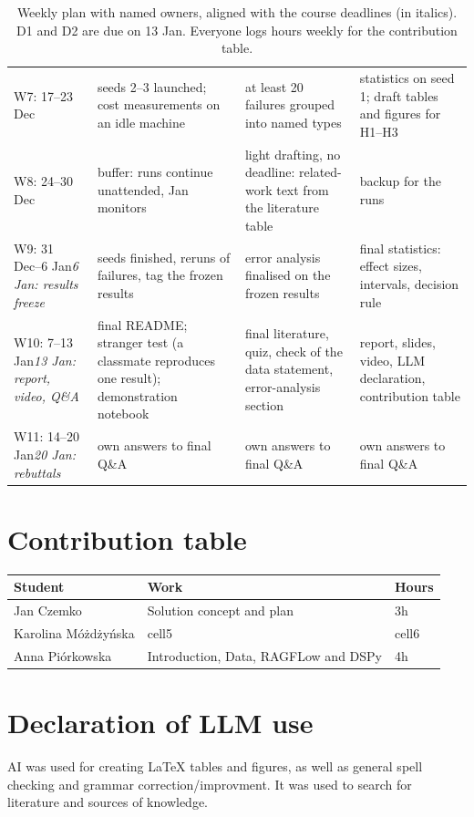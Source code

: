 \documentclass[11pt]{article}
\begin{document}
\begin{table}[t]
\begin{tabular}{@{}>{\raggedright\arraybackslash}p{2.7cm}>{\raggedright\arraybackslash}p{4.1cm}>{\raggedright\arraybackslash}p{4.1cm}>{\raggedright\arraybackslash}p{4.1cm}@{}}
\addlinespace
W7: 17--23 Dec & seeds 2--3 launched; cost measurements on an idle machine & at least 20 failures grouped into named types & statistics on seed 1; draft tables and figures for H1--H3\\
\addlinespace
W8: 24--30 Dec & buffer: runs continue unattended, Jan monitors & light drafting, no deadline: related-work text from the literature table & backup for the runs\\
\addlinespace
W9: 31 Dec--6 Jan\newline\textit{6 Jan: results freeze} & seeds finished, reruns of failures, tag the frozen results & error analysis finalised on the frozen results & final statistics: effect sizes, intervals, decision rule\\
\addlinespace
W10: 7--13 Jan\newline\textit{13 Jan: report, video, Q\&A} & final README; stranger test (a classmate reproduces one result); demonstration notebook & final literature, quiz, check of the data statement, error-analysis section & report, slides, video, LLM declaration, contribution table\\
\addlinespace
W11: 14--20 Jan\newline\textit{20 Jan: rebuttals} & own answers to final Q\&A & own answers to final Q\&A & own answers to final Q\&A\\
\bottomrule
\end{tabular}
\caption{Weekly plan with named owners, aligned with the course deadlines (in italics). D1 and D2 are due on 13 Jan. Everyone logs hours weekly for the contribution table.}
\label{tab:plan}
\end{table}


\section{Contribution table}
\begin{tabular}{ |p{3cm}|p{3cm}|p{1cm}| } 
\hline
Student & Work & Hours \\
\hline
Jan Czemko & Solution concept and plan & 3h \\ 
Karolina Móżdżyńska & cell5 & cell6 \\ 
Anna Piórkowska & Introduction, Data, RAGFLow and DSPy & 4h \\ 
\hline
\end{tabular}

\section{Declaration of LLM use}
AI was used for creating LaTeX tables and figures, as well as general spell checking and grammar correction/improvment. It was used to search for literature and sources of knowledge.
\end{document}
